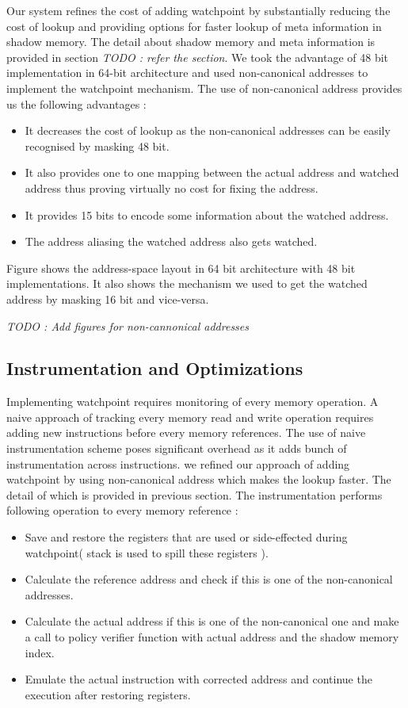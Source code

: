 Our system refines the cost of adding watchpoint by substantially reducing the cost of lookup and providing options for faster lookup of meta information in shadow memory. The detail about shadow memory and meta information is provided in section \emph{TODO : refer the section}. We took the advantage of 48 bit implementation in 64-bit architecture and used non-canonical addresses to implement the watchpoint mechanism. The use of non-canonical address provides us the following advantages :
\begin{itemize}
	\item It decreases the cost of lookup as the non-canonical addresses can be easily recognised by masking 48 bit.
	\item It also provides one to one mapping between the actual address and watched address thus proving virtually no cost for fixing the address.
	\item It provides 15 bits to encode some information about the watched address.
	\item The address aliasing the watched address also gets watched.
\end{itemize}   

Figure shows the address-space layout in 64 bit architecture with 48 bit implementations. It also shows the mechanism we used to get the watched address by masking 16 bit and vice-versa.

\emph{TODO : Add figures for non-cannonical addresses}


\subsection {Instrumentation and Optimizations}
Implementing watchpoint requires monitoring of every memory operation. A naive approach of tracking every memory read and write operation requires adding new instructions before every memory references. The use of naive instrumentation scheme poses significant overhead as it adds bunch of instrumentation across instructions. we refined our approach of adding watchpoint by using non-canonical address which makes the lookup faster. The detail of which is provided in previous section. The instrumentation performs following operation to every memory reference :

\begin{itemize}
	\item Save and restore the registers that are used or side-effected during watchpoint( stack is used to spill these registers ).
	\item Calculate the reference address and check if this is one of the non-canonical addresses.
	\item Calculate the actual address if this is one of the non-canonical one and make a call to policy verifier function with actual address and the shadow memory index. 
	\item Emulate the actual instruction with corrected address and continue the execution after restoring registers.
\end{itemize}

